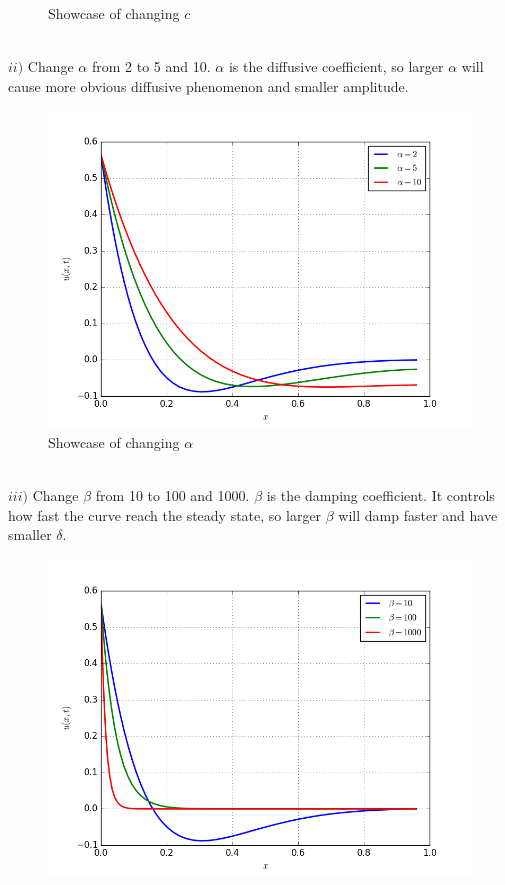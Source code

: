 \documentclass[12pt]{article}
\newenvironment{problem}[2][Problem]{\begin{trivlist}
\item[\hskip \labelsep {\bfseries #1}\hskip \labelsep {\bfseries #2.}]}{\end{trivlist}}
\begin{document}
\begin{problem}{3}
\begin{figure}[H]
 \caption{Showcase of changing $c$}
\label{label}
\end{figure}
\text{}\\
$ii)$ Change $\alpha$ from 2 to 5 and 10. $\alpha$ is the diffusive coefficient, so larger $\alpha$ will cause more obvious diffusive phenomenon and smaller amplitude.\\
\begin{figure}[H]
\centering
  \includegraphics[scale=0.6]{p3a_change_alpha.png}
 \caption{Showcase of changing $\alpha$}
\label{label}
\end{figure}
\text{}\\
$iii)$ Change $\beta$ from 10 to 100 and 1000. $\beta$ is the damping coefficient. It controls how fast the curve reach the steady state, so larger $\beta$ will damp faster and have smaller $\delta$.\\
\begin{figure}[H]
\centering
  \includegraphics[scale=0.5]{p3a_change_beta.png}

\end{figure}
\end{problem}
\end{document}
